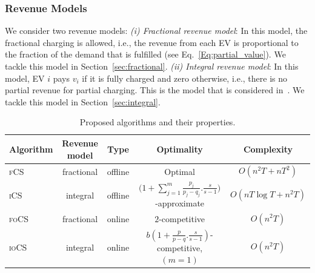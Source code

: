 \documentclass[journal]{IEEEtran}
\newcommand{\rev}[1]{{\color{black}#1}}%
\newcommand{\rev}[1]{#1}
\newcommand{\ics}{\textsc{iCS}\xspace}
\newcommand{\fcs}{\textsc{fCS}\xspace}
\newcommand{\focs}{\textsc{foCS}\xspace}
\newcommand{\iocs}{\textsc{ioCS}\xspace}
\begin{document}
\subsubsection{Revenue Models\label{sec:irm}} We consider two revenue models: 
\textit{(i) Fractional revenue model}: In this model, the fractional charging is allowed, i.e., the revenue from each EV is proportional to the fraction of the demand that is fulfilled \cite{Xiang} (see Eq.~\eqref{Eq:partial_value}). We tackle this model in Section~\ref{sec:fractional}.
\textit{(ii) Integral revenue model}: \rev{In this model, EV $i$ pays $v_i$ if it is fully charged and zero otherwise, i.e., there is no partial revenue for partial charging. }
This is the model that is considered in~\cite{WTang,Shroff2014}. We tackle this model in Section~\ref{sec:integral}.
		
		
		
			\begin{table}[!t]
			\centering
	\vspace{-3mm}
			\caption{Proposed algorithms and their properties.}
			\label{tbl:algs}
			\begin{tabular}{ | l | c | c | c |c|}
				\hline
				\textbf{Algorithm} & \textbf{Revenue model} & \textbf{Type} & \textbf{Optimality} & \textbf{Complexity} \\ \hline\hline    
				\fcs& fractional& offline& Optimal & $O(n^2T+nT^2)$\\\hline 
				\ics& integral& offline& ${\Big( 1+\sum_{j=1}^m {\frac{p_j}{p_j-q_j}}.\frac{s}{s-1}\Big)}$-approximate & $O(nT\log T+n^2T)$ \\\hline 
				\focs & fractional& online& $2$-competitive & $O(n^2T)$\\\hline 
				\iocs& integral&  online& $b(1+\frac{p}{p-q}.\frac{s}{s-1})$-competitive, $(m=1)$ & $O(n^2T)$\\\hline
			\end{tabular}
		\end{table}
		
\end{document}
